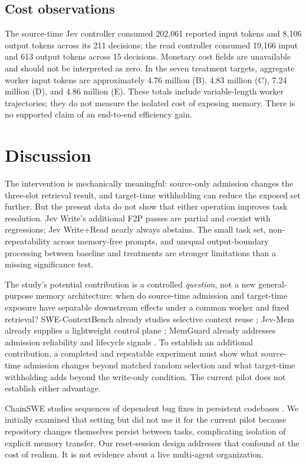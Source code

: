\documentclass[sigconf,anonymous]{aamas}
\begin{document}
\subsection{Cost observations}
The source-time Jev controller consumed 202,061 reported input tokens and 8,106 output tokens across its 211 decisions; the read controller consumed 19,166 input and 613 output tokens across 15 decisions. Monetary cost fields are unavailable and should not be interpreted as zero. In the seven treatment targets, aggregate worker input tokens are approximately 4.76 million (B), 4.83 million (C), 7.24 million (D), and 4.86 million (E). These totals include variable-length worker trajectories; they do not measure the isolated cost of exposing memory. There is no supported claim of an end-to-end efficiency gain.

\section{Discussion}
The intervention is mechanically meaningful: source-only admission changes the three-slot retrieval result, and target-time withholding can reduce the exposed set further. But the present data do not show that either operation improves task resolution. Jev Write's additional F2P passes are partial and coexist with regressions; Jev Write+Read nearly always abstains. The small task set, non-repeatability across memory-free prompts, and unequal output-boundary processing between baseline and treatments are stronger limitations than a missing significance test.

The study's potential contribution is a controlled \emph{question}, not a new general-purpose memory architecture: when do source-time admission and target-time exposure have separable downstream effects under a common worker and fixed retrieval? SWE-ContextBench already studies selective context reuse \cite{zhu2026swecontext}; Jev-Mem already supplies a lightweight control plane \cite{jiang2026jevmem}; MemGuard already addresses admission reliability and lifecycle signals \cite{wang2026memguard}. To establish an additional contribution, a completed and repeatable experiment must show what source-time admission changes beyond matched random selection and what target-time withholding adds beyond the write-only condition. The current pilot does not establish either advantage.

ChainSWE studies sequences of dependent bug fixes in persistent codebases \cite{jin2026chainswe}. We initially examined that setting but did not use it for the current pilot because repository changes themselves persist between tasks, complicating isolation of explicit memory transfer. Our reset-session design addresses that confound at the cost of realism. It is not evidence about a live multi-agent organization.
\end{document}
